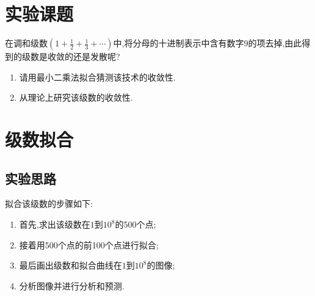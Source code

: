 \documentclass[a4paper,12pt]{article}
\begin{document}
\begin{CJK*}{UTF8}{gbsn}


\section{实验课题}
在调和级数$\displaystyle(1+\frac{1}{2}+\frac{1}{3}+\cdots)$中,将分母的十进制表示中含有数字$9$的项去掉,由此得到的级数是收敛的还是发散呢?\par 
\begin{enumerate}
\item 请用最小二乘法拟合猜测该技术的收敛性.
\item 从理论上研究该级数的收敛性.
\end{enumerate}

\section{级数拟合}

\subsection{实验思路}
\noindent 拟合该级数的步骤如下:
\begin{enumerate}
\item 首先,求出该级数在$1$到$10^8$的500个点;
\item 接着用500个点的前100个点进行拟合;
\item 最后画出级数和拟合曲线在$1$到$10^8$的图像;
\item 分析图像并进行分析和预测.
\end{enumerate}


\end{CJK*}
\end{document}
